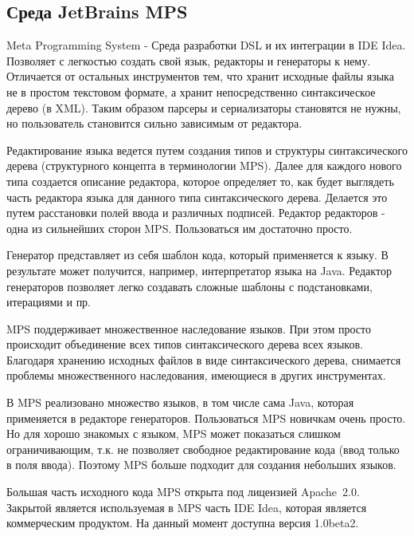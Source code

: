 \documentclass[a4paper,12pt]{article}
\begin{document}
\subsection{Среда JetBrains MPS}
Meta Programming System - Среда разработки DSL и их интеграции в IDE Idea.
Позволяет с легкостью создать свой язык, редакторы и генераторы к нему.
Отличается от остальных инструментов тем, что хранит исходные файлы языка не в
простом текстовом формате, а хранит непосредственно синтаксическое дерево (в
XML). Таким образом парсеры и сериализаторы становятся не нужны, но
пользователь становится сильно зависимым от редактора.

Редактирование языка ведется путем создания типов и структуры синтаксического
дерева (структурного концепта в терминологии MPS). Далее для каждого нового типа
создается описание редактора, которое определяет то, как будет выглядеть часть
редактора языка для данного типа синтаксического дерева. Делается это путем
расстановки полей ввода и различных подписей. Редактор редакторов - одна из
сильнейших сторон MPS. Пользоваться им достаточно просто.

Генератор представляет из себя шаблон кода, который применяется к языку. В
результате может получится, например, интерпретатор языка на Java. Редактор
генераторов позволяет легко создавать сложные шаблоны с подстановками,
итерациями и пр.

MPS поддерживает множественное наследование языков. При этом просто происходит 
объединение всех типов синтаксического дерева всех языков. Благодаря хранению
исходных файлов в виде синтаксического дерева, снимается проблемы
множественного наследования, имеющиеся в других инструментах.

В MPS реализовано множество языков, в том числе сама Java, которая применяется
в редакторе генераторов. Пользоваться MPS новичкам очень просто. Но для хорошо
знакомых с языком, MPS может показаться слишком ограничивающим, т.к. не позволяет
свободное редактирование кода (ввод только в поля ввода). Поэтому MPS больше
подходит для создания небольших языков.

Большая часть исходного кода MPS открыта под лицензией Apache~2.0. Закрытой
является используемая в MPS часть IDE Idea, которая является коммерческим
продуктом.
На данный момент доступна версия 1.0beta2.
\end{document}
